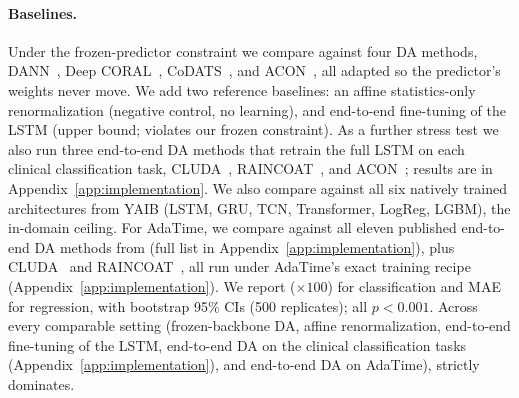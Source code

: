 \paragraph{Baselines.}
Under the frozen-predictor constraint we compare against four DA methods, DANN~\citep{ganin2016dann}, Deep CORAL~\citep{sun2016coral}, CoDATS~\citep{wilson2020codats}, and ACON~\citep{liu2024acon}, all adapted so the predictor's weights never move.
We add two reference baselines: an affine statistics-only renormalization (negative control, no learning), and end-to-end fine-tuning of the LSTM (upper bound; violates our frozen constraint). As a further stress test we also run three end-to-end DA methods that retrain the full LSTM on each clinical classification task, CLUDA~\citep{ozyurt2023cluda}, RAINCOAT~\citep{he2023raincoat}, and ACON~\citep{liu2024acon}; results are in Appendix~\ref{app:implementation}.
We also compare against all six natively trained architectures from YAIB (LSTM, GRU, TCN, Transformer, LogReg, LGBM), the in-domain ceiling.
For AdaTime, we compare against all eleven published end-to-end DA methods from \citet{ragab2023adatime} (full list in Appendix~\ref{app:implementation}), plus CLUDA~\citep{ozyurt2023cluda} and RAINCOAT~\citep{he2023raincoat}, all run under AdaTime's exact training recipe (Appendix~\ref{app:implementation}).
We report \aucroc{} ($\times 100$) for classification and MAE for regression, with bootstrap 95\% CIs (500 replicates); all $p < 0.001$.
Across every comparable setting (frozen-backbone DA, affine renormalization, end-to-end fine-tuning of the LSTM, end-to-end DA on the clinical classification tasks (Appendix~\ref{app:implementation}), and end-to-end DA on AdaTime), \retr{} strictly dominates.

